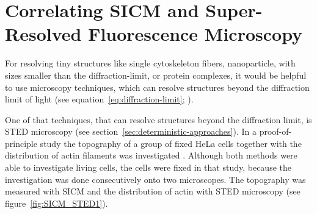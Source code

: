 \section{Correlating SICM and Super-Resolved Fluorescence Microscopy}
\label{sec:correlating-sicm-and-srfm}

For resolving tiny structures like single cytoskeleton fibers, nanoparticle, with sizes smaller
than the diffraction-limit, or protein complexes, it would be helpful to use microscopy
techniques, which can resolve structures beyond the diffraction limit of light (see 
equation~\ref{eq:diffraction-limit}; \cite{Abbe1873}).


One of that techniques, that can resolve structures beyond the diffraction limit, is STED 
microscopy (see section~\ref{sec:deterministic-approaches}). In a proof-of-principle study the 
topography of a group of fixed HeLa cells together with the distribution of actin filaments was
investigated \cite{Hagemann2018}. Although both methods were able to investigate living cells, the 
cells were fixed in that study, because the investigation was done consecutively onto two 
microscopes. The topography was measured with SICM and the distribution of actin with STED 
microscopy (see figure~\ref{fig:SICM_STED1}).


